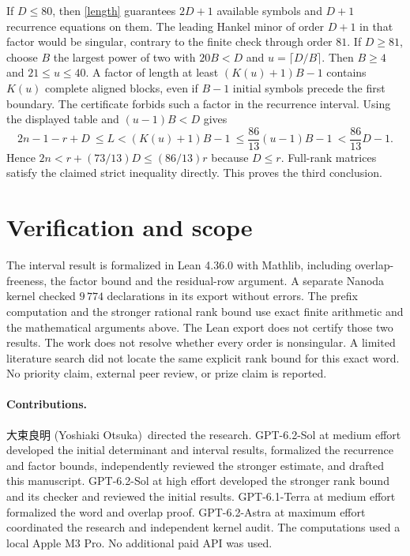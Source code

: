 \documentclass[10pt]{article}
\newcommand{\director}{{\namefont 大束良明} (Yoshiaki Otsuka)}
\begin{document}
If \(D\le80\), then \eqref{length} guarantees \(2D+1\) available symbols and \(D+1\) recurrence equations on them. The leading Hankel minor of order \(D+1\) in that factor would be singular, contrary to the finite check through order \(81\). If \(D\ge81\), choose \(B\) the largest power of two with \(20B<D\) and \(u=\lceil D/B\rceil\). Then \(B\ge4\) and \(21\le u\le40\). A factor of length at least \((K(u)+1)B-1\) contains \(K(u)\) complete aligned blocks, even if \(B-1\) initial symbols precede the first boundary. The certificate forbids such a factor in the recurrence interval. Using the displayed table and \((u-1)B<D\) gives
\[
 2n-1-r+D\ \le L < (K(u)+1)B-1
 \ \le\frac{86}{13}(u-1)B-1
 \ <\frac{86}{13}D-1 .
\]
Hence \(2n<r+(73/13)D\le(86/13)r\) because \(D\le r\). Full-rank matrices satisfy the claimed strict inequality directly. This proves the third conclusion.

\section{Verification and scope}
The interval result is formalized in Lean 4.36.0 with Mathlib, including overlap-freeness, the factor bound and the residual-row argument. A separate Nanoda kernel checked \(9\,774\) declarations in its export without errors. The prefix computation and the stronger rational rank bound use exact finite arithmetic and the mathematical arguments above. The Lean export does not certify those two results. The work does not resolve whether every order is nonsingular. A limited literature search did not locate the same explicit rank bound for this exact word. No priority claim, external peer review, or prize claim is reported.

\paragraph{Contributions.}
\director\ directed the research. GPT-6.2-Sol at medium effort developed the initial determinant and interval results, formalized the recurrence and factor bounds, independently reviewed the stronger estimate, and drafted this manuscript. GPT-6.2-Sol at high effort developed the stronger rank bound and its checker and reviewed the initial results. GPT-6.1-Terra at medium effort formalized the word and overlap proof. GPT-6.2-Astra at maximum effort coordinated the research and independent kernel audit. The computations used a local Apple M3 Pro. No additional paid API was used.

\appendix
\end{document}
